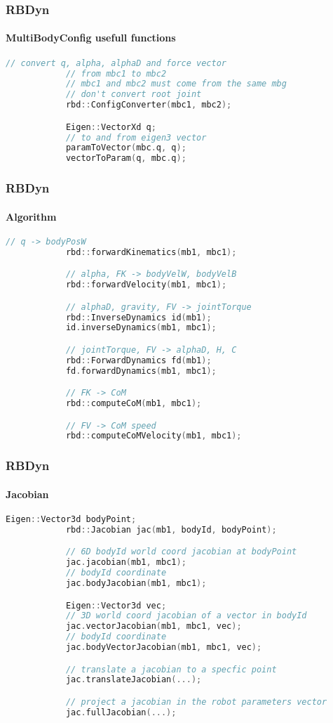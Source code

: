 \documentclass{beamer}
\begin{document}
	\begin{frame}[fragile]
		\frametitle{RBDyn}
		\framesubtitle{MultiBodyConfig usefull functions}
		\begin{lstlisting}[language=C++]
			// convert q, alpha, alphaD and force vector
			// from mbc1 to mbc2
			// mbc1 and mbc2 must come from the same mbg
			// don't convert root joint
			rbd::ConfigConverter(mbc1, mbc2);

			Eigen::VectorXd q;
			// to and from eigen3 vector
			paramToVector(mbc.q, q);
			vectorToParam(q, mbc.q);
		\end{lstlisting}
	\end{frame}

	\begin{frame}[fragile]
		\frametitle{RBDyn}
		\framesubtitle{Algorithm}
		\begin{lstlisting}[language=C++]
			// q -> bodyPosW
			rbd::forwardKinematics(mb1, mbc1);

			// alpha, FK -> bodyVelW, bodyVelB
			rbd::forwardVelocity(mb1, mbc1);

			// alphaD, gravity, FV -> jointTorque
			rbd::InverseDynamics id(mb1);
			id.inverseDynamics(mb1, mbc1);

			// jointTorque, FV -> alphaD, H, C
			rbd::ForwardDynamics fd(mb1);
			fd.forwardDynamics(mb1, mbc1);

			// FK -> CoM
			rbd::computeCoM(mb1, mbc1);

			// FV -> CoM speed
			rbd::computeCoMVelocity(mb1, mbc1);
		\end{lstlisting}
	\end{frame}

	\begin{frame}[fragile]
		\frametitle{RBDyn}
		\framesubtitle{Jacobian}
		\begin{lstlisting}[language=C++]
			Eigen::Vector3d bodyPoint;
			rbd::Jacobian jac(mb1, bodyId, bodyPoint);

			// 6D bodyId world coord jacobian at bodyPoint
			jac.jacobian(mb1, mbc1);
			// bodyId coordinate
			jac.bodyJacobian(mb1, mbc1);

			Eigen::Vector3d vec;
			// 3D world coord jacobian of a vector in bodyId
			jac.vectorJacobian(mb1, mbc1, vec);
			// bodyId coordinate
			jac.bodyVectorJacobian(mb1, mbc1, vec);

			// translate a jacobian to a specfic point
			jac.translateJacobian(...);

			// project a jacobian in the robot parameters vector
			jac.fullJacobian(...);
		\end{lstlisting}
	\end{frame}
\end{document}
